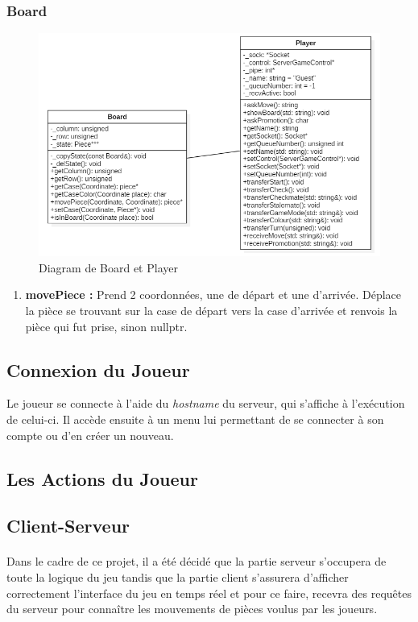 \documentclass[10pt, a4paper]{article}
\begin{document}
\subsubsection{Board}
\begin{figure}
\centering			\includegraphics[scale=0.50]{board_player_diagram.png}
\caption{Diagram de Board et Player}
\end{figure}
\begin{enumerate}
\item
\textbf{movePiece :} Prend 2 coordonnées, une de départ et une d'arrivée. Déplace la pièce se trouvant sur la case de départ vers la case d'arrivée et renvois la pièce qui fut prise, sinon nullptr.
\end{enumerate}
\newpage

\subsection{Connexion du Joueur}
Le joueur se connecte à l'aide du \textit{hostname} du serveur, qui s'affiche à l'exécution de celui-ci. Il accède ensuite à un menu lui permettant de se connecter à son compte ou d'en créer un nouveau.

\subsection{Les Actions du Joueur}

\subsection{Client-Serveur}
\paragraph{}Dans le cadre de ce projet, il a été décidé que la partie serveur s'occupera de toute la logique du jeu tandis que la partie client s'assurera d'afficher correctement l'interface du jeu en temps réel et pour ce faire, recevra des requêtes du serveur pour connaître les mouvements de pièces voulus par les joueurs.
\end{document}
